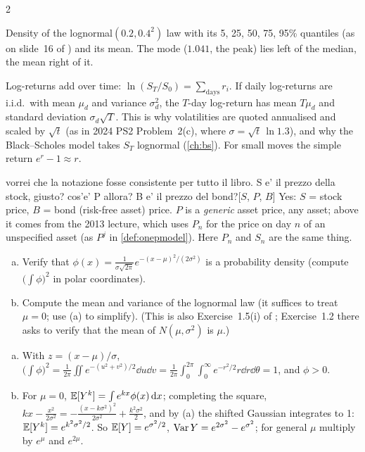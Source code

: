 \begin{paracol}{2}
\begin{solution}
\begin{center}
\footnotesize Density of the lognormal$(0.2,0.4^2)$ law with its 5, 25, 50, 75, 95\% quantiles (as on slide~16
of ) and its mean. The mode ($1.041$, the peak) lies left of the median, the mean right of it.
\end{center}
\end{solution}

\begin{finance}
Log-returns add over time: $\ln(S_T/S_0)=\sum_{\text{days}}r_i$. If daily log-returns are i.i.d.\ with mean
$\mu_d$ and variance $\sigma_d^2$, the $T$-day log-return has mean $T\mu_d$ and standard deviation
$\sigma_d\sqrt T$. This is why volatilities are quoted annualised and scaled by $\sqrt t$ (as in 2024 PS2
Problem~2(c), where $\sigma=\sqrt t\,\ln1.3$), and why the Black--Scholes model takes $S_T$ lognormal
(\cref{ch:bs}). For small moves the simple return $e^{r}-1\approx r$.
\end{finance}\begin{answer}{vorrei che la notazione fosse consistente per tutto il libro. S e' il prezzo della stock, giusto? cos'e' P allora? B e' il prezzo del bond?}[$S$, $P$, $B$]
Yes: $S$ = stock price, $B$ = bond (risk-free asset) price. $P$ is a \emph{generic} asset price, any asset;
above it comes from the 2013 lecture, which uses $P_n$ for the price on day $n$ of an unspecified asset
(as $P^j$ in \cref{def:onepmodel}). Here $P_n$ and $S_n$ are the same thing.
\end{answer}

\begin{exercise}[PS2 (2013), B-2]\label{ch03:ex-b2}
\leavevmode
\begin{enumerate}[(a)]
  \item Verify that $\phi(x)=\frac1{\sigma\sqrt{2\pi}}e^{-(x-\mu)^2/(2\sigma^2)}$ is a probability density (compute
      $\bigl(\int\phi\bigr)^2$ in polar coordinates).
  \item Compute the mean and variance of the lognormal law (it suffices to
      treat $\mu=0$; use (a) to simplify). (This is also Exercise~1.5(i) of ; Exercise~1.2 there asks
      to verify that the mean of $N(\mu,\sigma^2)$ is $\mu$.)
\end{enumerate}
\end{exercise}
\begin{solution}[ch03:ex-b2]
\begin{enumerate}[(a)]
  \item With $z=(x-\mu)/\sigma$, $\bigl(\int\phi\bigr)^2=\frac1{2\pi}\iint e^{-(u^2+v^2)/2}\dd u\dd v=\frac1{2\pi}\int_0^{2\pi}\!\!\int_0^\infty
        e^{-r^2/2}r\dd r\dd\theta=1$, and $\phi>0$.
  \item For $\mu=0$, $\mathbb{E}[Y^k]=\int e^{kx}\phi(x)\,\mathrm{d} x$; completing the square, $kx-\frac{x^2}{2\sigma^2}=-\frac{(x-k\sigma^2)^2}{2\sigma^2}+\frac{k^2\sigma^2}2$,
        and by (a) the shifted Gaussian integrates to 1: $\mathbb{E}[Y^k]=e^{k^2\sigma^2/2}$. So $\mathbb{E}[Y]=e^{\sigma^2/2}$,
        $\operatorname{Var} Y=e^{2\sigma^2}-e^{\sigma^2}$; for general $\mu$ multiply by $e^{\mu}$ and $e^{2\mu}$.
\end{enumerate}
\end{solution}


\end{paracol}
